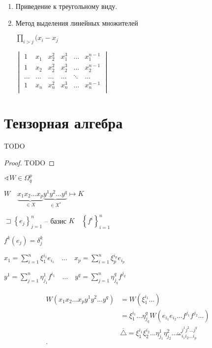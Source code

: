 \documentclass{book}
\newcommand{\ov}[1]{\overline{#1}}
\theoremstyle{definition}
\begin{document}
\begin{enumerate}
    \item Приведение к треугольному виду.
    \item Метод выделения линейных множителей

        \begin{definition}
            $\prod_{i>j}(x_i-x_j$

             $
             \begin{vmatrix}
                 1 & x_1 &x_2^2 & x_1^3 & \ldots & x_1^{n-1}\\
                 1 & x_2 &x_2^2 & x_2^3 & \ldots & x_2^{n-1}\\
                 \ldots&\ldots&\ldots&\ldots& \ddots & \ldots\\
                 1 & x_n & x_n^2 & x_n^3 & \ldots & x_n^{n-1}\\
             \end{vmatrix}$
        \end{definition}
\end{enumerate}

\section{Тензорная алгебра}

\begin{theorem}
    TODO
\end{theorem}
\begin{proof}
    TODO
\end{proof}

$\sphericalangle W \in \Omega_q^p$

$W\quad \underbrace{x_1x_2\ldots x_p}_{\in X}\underbrace{y^1y^2 \ldots y^q}_{\in X^*} \mapsto K$

$\sqsupset \left\{ e_j \right\} _{j=1}^n$ -- базис $K\quad \left\{ f^i \right\} _{i=1}^n$ 

$f^k(e_j) = \delta_j^k$

$x_1 = \sum_{i=1}^{n} \xi_1^{i_1}e_{i_1} \quad \ldots\quad x_p = \sum_{i=1}^{n} \xi_p^{i_p} e_{i_p} $

$y^1 = \sum_{j=1}^{n} \eta_{j_1}^1f^{i_1}\quad \ldots\quad y^q = \sum_{j=1}^{n} \eta^q_{j_q}f^{j_q}$

\begin{align*}    
    W\left( x_1x_2\ldots x_p y^1 y^2 \ldots y^q \right) &= W\left( \xi_1^{i_1} \ldots \right)  \\
                                                        &= \xi_1^{i_1} \ldots \eta_{j_q}^qW\left( e_{i_1}e_{i_2} \ldots f^{j_1}f^{j_2} \ldots \right)  \\
                                                        &\ov{\triangle}= \xi_1^{i_1}\xi_2^{i_2} \ldots \eta^1_{j_1}\eta^2_{j_2} \ldots \omega_{i_1i_2\ldots i_p}^{j^1j^2 \ldots j^q}  \\
.\end{align*}
\end{document}
